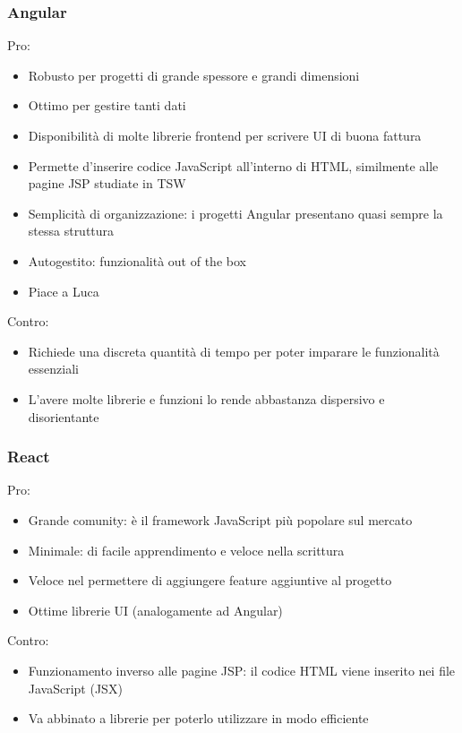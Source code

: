 \subsubsection{Angular}
Pro:
\begin{itemize}
    \renewcommand\labelitemi{\texttt{+}}
    \item Robusto per progetti di grande spessore e grandi dimensioni
    \item Ottimo per gestire tanti dati
    \item Disponibilità di molte librerie frontend per scrivere UI di buona fattura
    \item Permette d'inserire codice JavaScript all'interno di HTML, similmente alle pagine JSP studiate in TSW
    \item Semplicità di organizzazione: i progetti Angular presentano quasi sempre la stessa struttura
    \item Autogestito: funzionalità out of the box
    \item Piace a Luca
\end{itemize}
Contro:
\begin{itemize}
    \renewcommand\labelitemi{\texttt{-}}
    \item Richiede una discreta quantità di tempo per poter imparare le funzionalità essenziali
    \item L'avere molte librerie e funzioni lo rende abbastanza dispersivo e disorientante
\end{itemize}

\subsubsection{React}
Pro:
\begin{itemize}
    \renewcommand\labelitemi{\texttt{+}}
    \item Grande comunity: è il framework JavaScript più popolare sul mercato
    \item Minimale: di facile apprendimento e veloce nella scrittura
    \item Veloce nel permettere di aggiungere feature aggiuntive al progetto
    \item Ottime librerie UI (analogamente ad Angular)
\end{itemize}
Contro:
\begin{itemize}
    \renewcommand\labelitemi{\texttt{-}}
    \item Funzionamento inverso alle pagine JSP: il codice HTML viene inserito nei file JavaScript (JSX)
    \item Va abbinato a librerie per poterlo utilizzare in modo efficiente
\end{itemize}